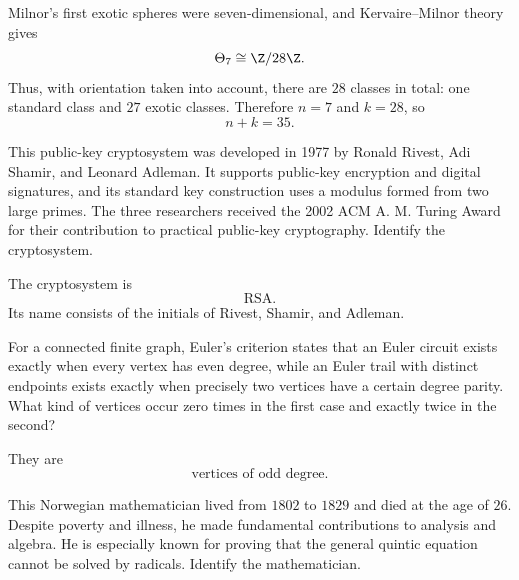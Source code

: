     \begin{solution}
        Milnor's first exotic spheres were seven-dimensional, and
        Kervaire--Milnor theory gives
        \[
            \Theta_7\cong\Z/28\Z.
        \]
        Thus, with orientation taken into account, there are $28$ classes in
        total: one standard class and $27$ exotic classes. Therefore $n=7$
        and $k=28$, so
        \[
            \boxed{n+k=35}.
        \]
    \end{solution}

    \begin{expectedproblem}
        This public-key cryptosystem was developed in 1977 by Ronald Rivest,
        Adi Shamir, and Leonard Adleman. It supports public-key encryption and
        digital signatures, and its standard key construction uses a modulus
        formed from two large primes. The three researchers received the 2002
        ACM A. M. Turing Award for their contribution to practical public-key
        cryptography. Identify the cryptosystem.
    \end{expectedproblem}

    \begin{solution}
        The cryptosystem is
        \[
            \boxed{\text{RSA}}.
        \]
        Its name consists of the initials of Rivest, Shamir, and Adleman.
    \end{solution}

    \begin{expectedproblem}
        For a connected finite graph, Euler's criterion states that an Euler
        circuit exists exactly when every vertex has even degree, while an
        Euler trail with distinct endpoints exists exactly when precisely two
        vertices have a certain degree parity. What kind of vertices occur
        zero times in the first case and exactly twice in the second?
    \end{expectedproblem}

    \begin{solution}
        They are
        \[
            \boxed{\text{vertices of odd degree}}.
        \]
    \end{solution}

    \begin{expectedproblem}
        This Norwegian mathematician lived from $1802$ to $1829$ and died at
        the age of $26$. Despite poverty and illness, he made fundamental
        contributions to analysis and algebra. He is especially known for
        proving that the general quintic equation cannot be solved by radicals.
        Identify the mathematician.
    \end{expectedproblem}

